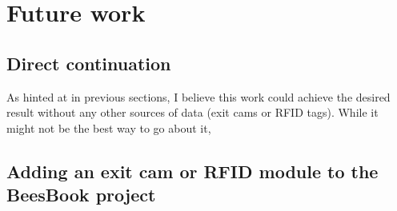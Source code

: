 
\chapter{Future work}  %

\ifpdf
    \graphicspath{{Chapters/Chapter6/Figs/Raster/}{Chapters/Chapter6/Figs/PDF/}{Chapters/Chapter6/Figs/}}
\else
    \graphicspath{{Chapters/Chapter6/Figs/Vector/}{Chapters/Chapter6/Figs/}}
\fi


\section{Direct continuation}

As hinted at in previous sections, I believe this work could achieve the desired result without any other sources of data (exit cams or RFID tags). While it might not be the best way to go about it, 




\section{Adding an exit cam or RFID module to the BeesBook project}








